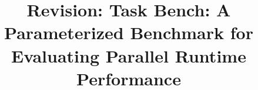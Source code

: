 



\title{Revision: Task Bench: A Parameterized Benchmark for Evaluating Parallel Runtime Performance}


\maketitle















